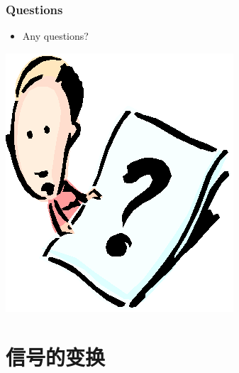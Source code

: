 \documentclass[CJKutf8,xcolor=pdftex,dvipsnames,table]{beamer}
\begin{document}
\begin{CJK*}{UTF8}{song}
  \begin{frame}
    \frametitle{Questions}
    \begin{itemize}
    \item Any questions?
    \end{itemize}
    \begin{center}
      \includegraphics[scale=.5]{question}
    \end{center}
  \end{frame}
  
  \section{信号的变换}
  

\end{CJK*}
\end{document}

